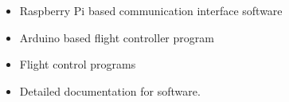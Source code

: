\begin{itemize}
  \item Raspberry Pi based communication interface software
  \item Arduino based flight controller program
  \item Flight control programs
  \item Detailed documentation for software.
\end{itemize}
